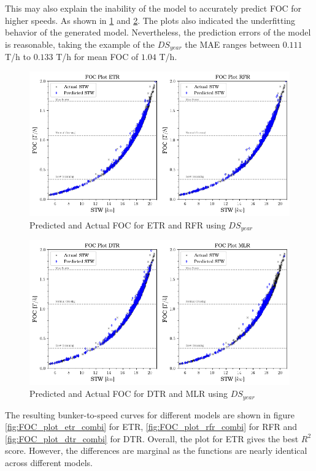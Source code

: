 This may also explain the inability of the model to accurately predict FOC for higher speeds. As shown in \cref{fig:foc_etr_rfr_yr} and \cref{fig:foc_dtr_mlr_yr}. The plots also indicated the underfitting behavior of the generated model. Nevertheless, the prediction errors of the model is reasonable, taking the example of the $DS_{year}$ the MAE ranges between $0.111$ T/h to $0.133$ T/h for mean FOC of $1.04$ T/h.\\

\begin{figure}
    \centering
    \includegraphics[width=.9\linewidth]{02_figures/FOC_act_pred_etr_rfr.png}
    \caption{Predicted and Actual FOC for ETR and RFR using $DS_{year}$}
    \label{fig:foc_etr_rfr_yr}
\end{figure}

\begin{figure}
    \centering
    \includegraphics[width=.9\linewidth]{02_figures/FOC_act_pred_dtr_mlr.png}
    \caption{Predicted and Actual FOC for DTR and MLR using $DS_{year}$}
    \label{fig:foc_dtr_mlr_yr}
\end{figure}

The resulting bunker-to-speed curves for different models are shown in figure \cref{fig:FOC_plot_etr_combi} for ETR, \cref{fig:FOC_plot_rfr_combi} for RFR and \cref{fig:FOC_plot_dtr_combi} for DTR. Overall, the plot for ETR gives the best $R^2$ score. However, the differences are marginal as the functions are nearly identical across different models.\\ 

